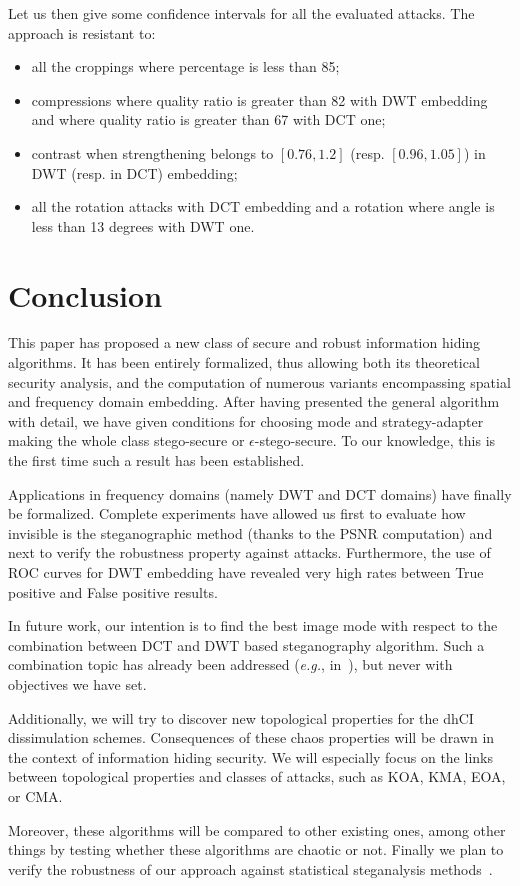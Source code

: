 \documentclass{comjnl}
\begin{document}
Let us then give some confidence intervals for all the evaluated attacks. The
approach is resistant to:
\begin{itemize}
\item all the croppings where percentage is less than 85;
\item compressions where quality ratio is greater 
  than 82 with DWT embedding and 
  where quality ratio is greater than 67 with DCT one;
\item contrast when strengthening belongs to $[0.76,1.2]$ 
(resp. $[0.96,1.05]$)  in DWT (resp. in DCT) embedding;
\item all the rotation attacks with DCT embedding and a rotation where
angle is less than 13 degrees with DWT one.
\end{itemize}


\section{Conclusion}\label{sec:concl}
This paper has proposed a new class of secure and robust information hiding 
algorithms.
It has been entirely formalized, thus allowing both its theoretical security 
analysis, and the computation of numerous variants encompassing spatial and 
frequency domain embedding.
After having presented the general algorithm with detail, we have given
conditions for choosing mode and strategy-adapter making the whole
class  stego-secure or $\epsilon$-stego-secure.
To our knowledge, this is the first time such a result has been established.

Applications in frequency domains (namely DWT and DCT domains) have finally be
formalized.
Complete experiments have allowed us 
first to evaluate how invisible is the steganographic method (thanks to the PSNR computation) and next to verify the robustness property against attacks.
Furthermore, the use of ROC curves for DWT embedding have revealed very high rates
between True positive and False positive results.

In future work, our intention is to find the best image mode with respect to  
the combination between  DCT and DWT based steganography
algorithm. Such a combination topic has already been addressed
(\textit{e.g.}, in~\cite{al2007combined}), but never with objectives
we have set.


Additionally, we will try to discover new topological properties for the dhCI
dissimulation schemes.
Consequences of these chaos properties will be drawn in the context of 
information hiding security.
We will especially focus on the links between topological properties and classes
of attacks, such as KOA, KMA, EOA, or CMA.

Moreover, these algorithms will be compared to other existing ones, among other
things by testing whether these algorithms are chaotic or not.
Finally we plan to verify the robustness of our approach 
against statistical steganalysis methods~\cite{GFH06,ChenS08,DongT08,FridrichKHG11a}.







\end{document}

